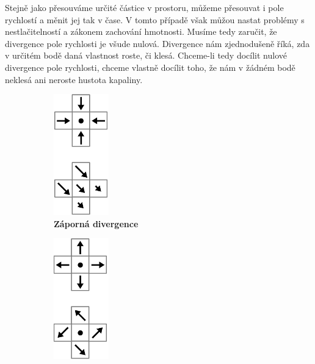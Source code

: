 Stejně jako přesouváme určité částice v prostoru, můžeme přesouvat i pole rychlostí a měnit jej tak v čase. V tomto případě však můžou nastat problémy s nestlačitelností a zákonem zachování hmotnosti. Musíme tedy zaručit, že divergence pole rychlosti je všude nulová. Divergence nám zjednodušeně říká, zda v určitém bodě daná vlastnost roste, či klesá. Chceme-li tedy docílit nulové divergence pole rychlosti, chceme vlastně docílit toho, že nám v žádném bodě neklesá ani neroste hustota kapaliny. \cite{webglFluid}

\begin{figure}[h]
\centering
\begin{subfigure}{.3\textwidth}
  	\centering
	\includegraphics[width=0.35\linewidth]{obrazky-figures/div-negative.png}
	\caption{\textbf{Záporná divergence}}
	\label{fig:Euler}
\end{subfigure}%
\begin{subfigure}{.3\textwidth}
  	\centering
	\includegraphics[width=0.35\linewidth]{obrazky-figures/div-positive.png}

\end{subfigure}
\end{figure}
